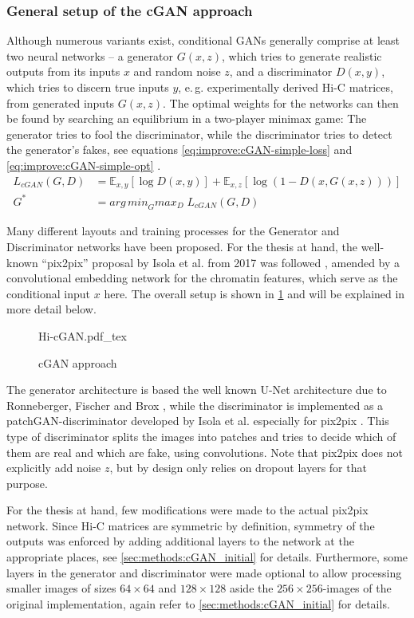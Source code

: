 \subsubsection{General setup of the cGAN approach}
Although numerous variants exist, conditional GANs generally comprise at least two neural networks -- 
a generator $G(x,z)$, which tries to generate realistic outputs from its inputs $x$ and random noise $z$, and a discriminator $D(x,y)$,
which tries to discern true inputs $y$, e.\,g. experimentally derived Hi-C matrices, from generated inputs $G(x,z)$.
The optimal weights for the networks can then be found by searching an equilibrium in a two-player minimax game:
The generator tries to fool the discriminator, while the discriminator tries to detect the generator's fakes, 
see equations \ref{eq:improve:cGAN-simple-loss} and \ref{eq:improve:cGAN-simple-opt} \cite{Isola2017}.
\begin{align}
 L_\mathit{cGAN}(G, D) &= \mathbb{E}_{x,y}[\log D(x,y)] + \mathbb{E}_{x,z}[\log(1-D(x, G(x,z)))] \label{eq:improve:cGAN-simple-loss} \\
 G^* &=  \mathit{arg\,min}_G \mathit{max}_D \; L_\mathit{cGAN}(G, D) \label{eq:improve:cGAN-simple-opt}
\end{align}

Many different layouts and training processes for the Generator and Discriminator networks have been proposed.
For the thesis at hand, the well-known ``pix2pix'' proposal by Isola et al. from 2017 was followed \cite{Isola2017}, 
amended by a convolutional embedding network for the chromatin features, which serve as the conditional input $x$ here.
The overall setup is shown in \cref{fig:improve:cGAN-approach} and will be explained in more detail below.
\begin{figure}[htbp]
 {Hi-cGAN.pdf_tex}
 \caption{cGAN approach} \label{fig:improve:cGAN-approach}
\end{figure}
The generator architecture is based the well known U-Net architecture due to Ronneberger, Fischer and Brox \cite{Ronneberger2015},
while the discriminator is implemented as a patchGAN-discriminator developed by Isola et al. especially for pix2pix \cite{Isola2017}.
This type of discriminator splits the images into patches and tries to decide which of them are real and which are fake, using convolutions.
Note that pix2pix does not explicitly add noise $z$, but by design only relies on dropout layers for that purpose. 

For the thesis at hand, few modifications were made to the actual pix2pix network.
Since Hi-C matrices are symmetric by definition, symmetry of the outputs was enforced
by adding additional layers to the network at the appropriate places, see \cref{sec:methods:cGAN_initial} for details.
Furthermore, some layers in the generator and discriminator were made optional to allow processing smaller images of sizes $64\times64$
and $128\times128$ aside the $256\times256$-images of the original implementation, again refer to \cref{sec:methods:cGAN_initial} for details.

